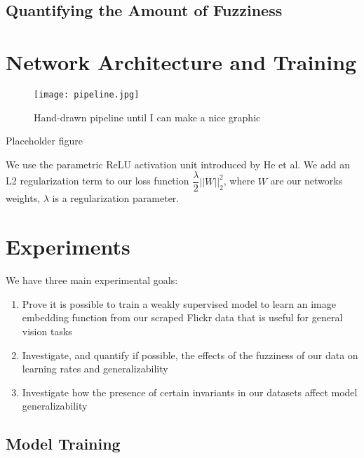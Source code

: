 \documentclass[pageno]{jpaper}
\begin{document}
\subsection{Quantifying the Amount of Fuzziness}

\section{Network Architecture and Training}

\begin{figure}[!tbp]
  \centering
  \texttt{[image: pipeline.jpg]}
  \caption{Hand-drawn pipeline until I can make a nice graphic}
  \label{fig:pipeline}
\end{figure}
Placeholder figure

We use the parametric ReLU activation unit introduced by He et al.\cite{he2016deep} We add an L2 regularization term to our loss function $\dfrac{\lambda}{2}||W||_2^2$, where $W$ are our networks weights, $\lambda$ is a regularization parameter. 

\section{Experiments}
We have three main experimental goals:
\begin{enumerate}
\item Prove it is possible to train a weakly supervised model to learn an image embedding function from our scraped Flickr data that is useful for general vision tasks
\item Investigate, and quantify if possible, the effects of the fuzziness of our data on learning rates and generalizability
\item Investigate how the presence of certain invariants in our datasets affect model generalizability
\end{enumerate}

\subsection{Model Training}
\end{document}
